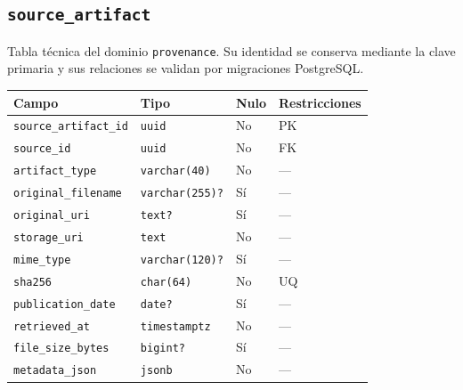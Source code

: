 \documentclass[11pt]{article}
\begin{document}
\subsection{\texttt{source\_artifact}}
Tabla técnica del dominio \texttt{provenance}. Su identidad se conserva mediante la clave primaria y sus relaciones se validan por migraciones PostgreSQL.
\begin{longtable}{>{\raggedright\arraybackslash}p{} p{} p{} p{}}
\toprule Campo & Tipo & Nulo & Restricciones \\ \midrule\endhead
\texttt{source\_artifact\_id} & \texttt{uuid} & No & PK \\
\texttt{source\_id} & \texttt{uuid} & No & FK \\
\texttt{artifact\_type} & \texttt{varchar(40)} & No & --- \\
\texttt{original\_filename} & \texttt{varchar(255)?} & Sí & --- \\
\texttt{original\_uri} & \texttt{text?} & Sí & --- \\
\texttt{storage\_uri} & \texttt{text} & No & --- \\
\texttt{mime\_type} & \texttt{varchar(120)?} & Sí & --- \\
\texttt{sha256} & \texttt{char(64)} & No & UQ \\
\texttt{publication\_date} & \texttt{date?} & Sí & --- \\
\texttt{retrieved\_at} & \texttt{timestamptz} & No & --- \\
\texttt{file\_size\_bytes} & \texttt{bigint?} & Sí & --- \\
\texttt{metadata\_json} & \texttt{jsonb} & No & --- \\
\bottomrule\end{longtable}
\end{document}
